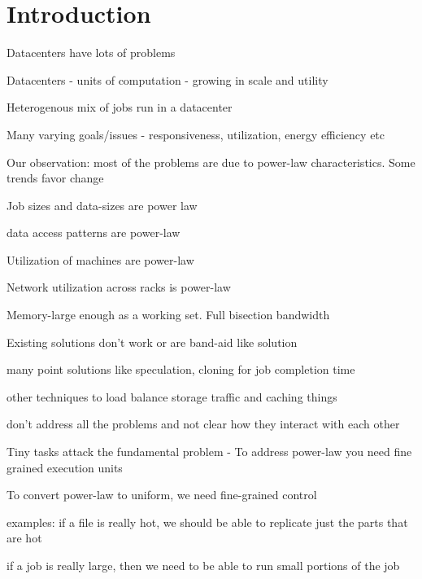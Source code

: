 \section{Introduction}
\label{sec:intro}

Datacenters have lots of problems
\begin{myitemize} 
  \item Datacenters - units of computation - growing in scale and utility~\cite{dc-teenage-decade}
  \item Heterogenous mix of jobs run in a datacenter~\cite{charles-socc, kay-yahoo}
  \item Many varying goals/issues - responsiveness, utilization, energy efficiency etc
\end{myitemize}

Our observation: most of the problems are due to power-law characteristics. Some trends favor change
\begin{myitemize} 
  \item Job sizes and data-sizes are power law
  \item data access patterns are power-law 
  \item Utilization of machines are power-law 
  \item Network utilization across racks is power-law 
  \item Memory-large enough as a working set. Full bisection bandwidth
\end{myitemize}

Existing solutions don't work or are band-aid like solution
\begin{myitemize} 
  \item many point solutions like speculation, cloning for job completion time
  \item other techniques to load balance storage traffic and caching things
  \item don't address all the problems and not clear how they interact with each other
\end{myitemize}

Tiny tasks attack the fundamental problem - To address power-law you need fine grained execution units 
\begin{myitemize} 
  \item To convert power-law to uniform, we need fine-grained control
  \item examples: if a file is really hot, we should be able to replicate just the parts that are hot
  \item if a job is really large, then we need to be able to run small portions of the job
\end{myitemize}

